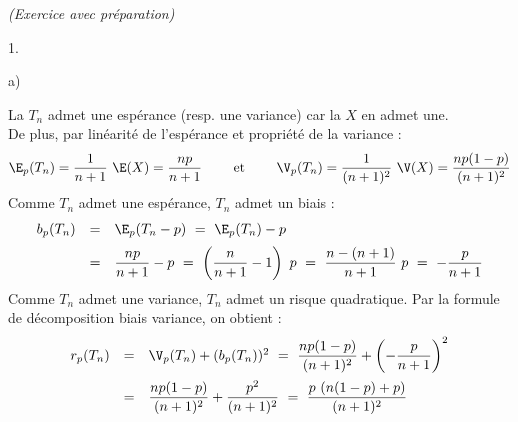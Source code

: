\documentclass[11pt]{article}%
\begin{document}
\begin{exercice}{\it (Exercice avec préparation)}
\begin{noliste}{1.}
\begin{noliste}{a)}
 \item La \var $T_{n}$ admet une espérance (resp. une variance) car
 la \var $X$ en admet une.\\
 De plus, par linéarité de l'espérance et propriété de la
 variance :
\[
 \E_{p}(T_{n}) = \dfrac{1}{n + 1} \ \E(X) = \dfrac{n p}{n + 1} \qquad
 \text{ et } \qquad \V_{p}(T_{n}) = \dfrac{1}{(n + 1)^{2}} \ \V(X) = 
 \dfrac{n p (1-p)}{(n + 1)^{2}}
\]
 Comme $T_{n}$ admet une espérance, $T_{n}$ admet un biais :
\[
\begin{array}{rcl}
 b_{p}(T_{n}) & = & \E_{p}(T_{n} - p) \ = \ \E_{p}(T_{n}) - p \\[.2cm]
 & = & \dfrac{n p}{n + 1} - p \ = \ \left( \dfrac{n}{n + 1} - 1
 \right) \ p \ = \ \dfrac{n - (n + 1)}{n + 1} \ p \ = \ -
 \dfrac{p}{n + 1}
\end{array}
\]
 Comme $T_{n}$ admet une variance, $T_{n}$ admet un risque
 quadratique. Par la formule de décomposition biais variance, on
 obtient : 
\[
\begin{array}{rcl}
 r_{p}(T_{n}) & = & \V_{p}(T_{n}) + (b_{p}(T_{n}))^{2} %
 \ = \ \dfrac{n p (1-p)}{(n + 1)^{2}} + \left(
 -\dfrac{p}{n + 1}\right)^{2} \\[.4cm]
 & = & \dfrac{n p (1-p)}{(n + 1)^{2}} + \dfrac{p^{2}}{(n + 1)^{2}} \ =
\
 \dfrac{p \ (n(1-p) + p)}{(n + 1)^{2}} 
\end{array}
\]
 \end{noliste}


\end{noliste}
\end{exercice}
\end{document}
